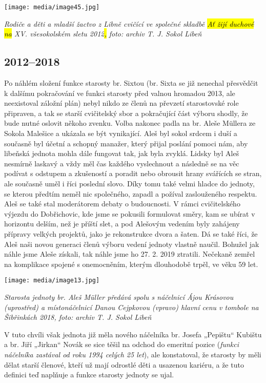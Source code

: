 \texttt{[image: media/image45.jpg]}

\emph{Rodiče a děti a mladší žactvo z Libně cvičící ve společné skladbě
\hl{Ať žijí duchové na} XV. všesokolském sletu 2012\hl{,} foto: archiv
T. J. Sokol Libeň}

\subsection{\texorpdfstring{2012--2018 }{2012--2018 }}\label{section-2}

Po náhlém složení funkce starosty br. Sixtou (br. Sixta se již nenechal
přesvědčit k dalšímu pokračování ve funkci starosty před valnou hromadou
2013, ale neexistoval záložní plán) nebyl nikdo ze členů na převzetí
starostovské role připraven, a tak se starší cvičitelský sbor a
pokračující část výboru shodly, že bude nutné oslovit někoho zvenku.
Volba nakonec padla na br. Aleše Müllera ze Sokola Malešice a ukázala se
být vynikající. Aleš byl sokol srdcem i duší a současně byl účetní a
schopný manažer, který přijal poslání pomoci nám, aby libeňská jednota
mohla dále fungovat tak, jak byla zvyklá. Lidsky byl Aleš nesmírně
laskavý a vždy měl čas každého vyslechnout a následně se na věc podívat
s odstupem a zkušeností a poradit nebo obrousit hrany svářících se
stran, ale současně uměl i říci poslední slovo. Díky tomu také velmi
hladce do jednoty, se kterou předtím neměl nic společného, zapadl a
požíval zaslouženého respektu. Aleš se také stal moderátorem debaty o
budoucnosti. V rámci cvičitelského výjezdu do Dobřichovic, kde jsme se
pokusili formulovat směry, kam se ubírat v horizontu delším, než je
příští slet, a pod Alešovým vedením byly zahájeny přípravy velkých
projektů, jako je rekonstrukce dvora a šaten. Dá se také říci, že Aleš
naši novou generaci členů výboru vedení jednoty vlastně naučil. Bohužel
jak náhle jsme Aleše získali, tak náhle jsme ho 27. 2. 2019 ztratili.
Nečekaně zemřel na komplikace spojené s onemocněním, kterým dlouhodobě
trpěl, ve věku 59 let.

\texttt{[image: media/image13.jpg]}

\emph{Starosta jednoty br. Aleš Müller předává spolu s náčelnicí Ájou
Krásovou (uprostřed) a místonáčelnicí Danou Cejpkovou (vpravo) hlavní
cenu v tombole na Šibřinkách 2018, foto: archiv T. J. Sokol Libeň}

V tuto chvíli však jednota již měla nového náčelníka br. Josefa
„Pepištu`` Kubištu a br. Jiří „Jirkan`` Novák se sice těšil na odchod do
emeritní pozice (\emph{funkci náčelníka zastával od roku 1994 celých 25
let}), ale konstatoval, že starosty by měli dělat starší členové, kteří
už mají odrostlé děti a usazenou kariéru, a že tuto definici teď
naplňuje a funkce starosty jednoty se ujal.

